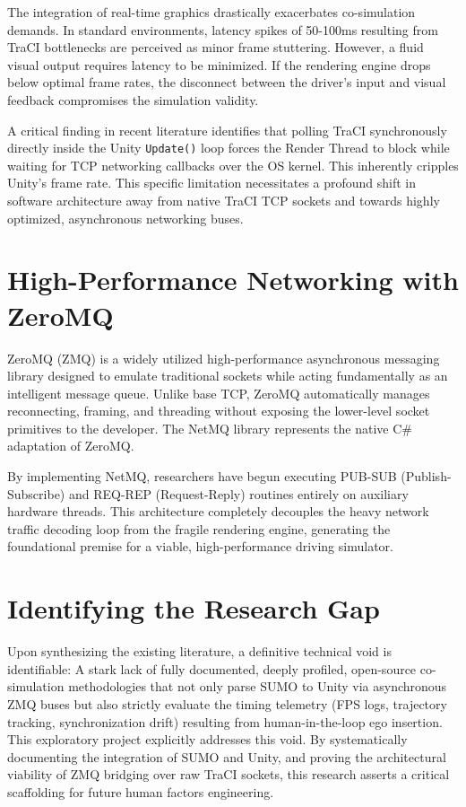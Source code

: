 The integration of real-time graphics drastically exacerbates co-simulation demands. In standard environments, latency spikes of 50-100ms resulting from TraCI bottlenecks are perceived as minor frame stuttering. However, a fluid visual output requires latency to be minimized. If the rendering engine drops below optimal frame rates, the disconnect between the driver's input and visual feedback compromises the simulation validity.

A critical finding in recent literature identifies that polling TraCI synchronously directly inside the Unity \texttt{Update()} loop forces the Render Thread to block while waiting for TCP networking callbacks over the OS kernel. This inherently cripples Unity's frame rate. This specific limitation necessitates a profound shift in software architecture away from native TraCI TCP sockets and towards highly optimized, asynchronous networking buses. 

\section{High-Performance Networking with ZeroMQ}

ZeroMQ (ZMQ) is a widely utilized high-performance asynchronous messaging library designed to emulate traditional sockets while acting fundamentally as an intelligent message queue. Unlike base TCP, ZeroMQ automatically manages reconnecting, framing, and threading without exposing the lower-level socket primitives to the developer. The NetMQ library represents the native C\# adaptation of ZeroMQ. 

By implementing NetMQ, researchers have begun executing PUB-SUB (Publish-Subscribe) and REQ-REP (Request-Reply) routines entirely on auxiliary hardware threads. This architecture completely decouples the heavy network traffic decoding loop from the fragile rendering engine, generating the foundational premise for a viable, high-performance driving simulator.

\section{Identifying the Research Gap}

Upon synthesizing the existing literature, a definitive technical void is identifiable: A stark lack of fully documented, deeply profiled, open-source co-simulation methodologies that not only parse SUMO to Unity via asynchronous ZMQ buses but also strictly evaluate the timing telemetry (FPS logs, trajectory tracking, synchronization drift) resulting from human-in-the-loop ego insertion. This exploratory project explicitly addresses this void. By systematically documenting the integration of SUMO and Unity, and proving the architectural viability of ZMQ bridging over raw TraCI sockets, this research asserts a critical scaffolding for future human factors engineering.
